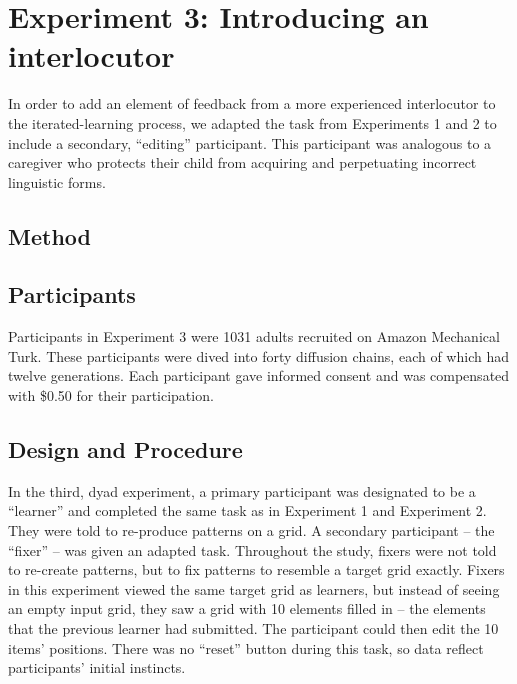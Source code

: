 \documentclass[10pt, letterpaper]{article}
\begin{document}
\hypertarget{experiment-3-introducing-an-interlocutor}{%
\section{Experiment 3: Introducing an
interlocutor}\label{experiment-3-introducing-an-interlocutor}}

In order to add an element of feedback from a more experienced
interlocutor to the iterated-learning process, we adapted the task from
Experiments 1 and 2 to include a secondary, ``editing'' participant.
This participant was analogous to a caregiver who protects their child
from acquiring and perpetuating incorrect linguistic forms.

\hypertarget{method-2}{%
\subsection{Method}\label{method-2}}

\hypertarget{participants-2}{%
\subsection{Participants}\label{participants-2}}

Participants in Experiment 3 were 1031 adults recruited on Amazon
Mechanical Turk. These participants were dived into forty diffusion
chains, each of which had twelve generations. Each participant gave
informed consent and was compensated with \$0.50 for their
participation.

\hypertarget{design-and-procedure-2}{%
\subsection{Design and Procedure}\label{design-and-procedure-2}}

In the third, dyad experiment, a primary participant was designated to
be a ``learner'' and completed the same task as in Experiment 1 and
Experiment 2. They were told to re-produce patterns on a grid. A
secondary participant -- the ``fixer'' -- was given an adapted task.
Throughout the study, fixers were not told to re-create patterns, but to
fix patterns to resemble a target grid exactly. Fixers in this
experiment viewed the same target grid as learners, but instead of
seeing an empty input grid, they saw a grid with 10 elements filled in
-- the elements that the previous learner had submitted. The participant
could then edit the 10 items' positions. There was no ``reset'' button
during this task, so data reflect participants' initial instincts.
\end{document}
